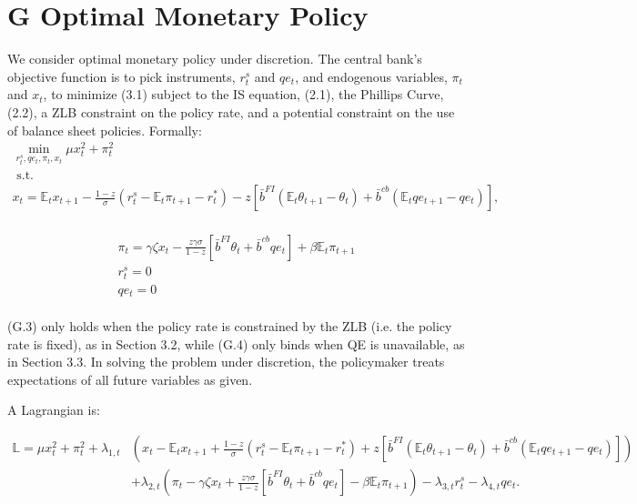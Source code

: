 \documentclass[10pt]{article}
\begin{document}
\section*{G Optimal Monetary Policy}
We consider optimal monetary policy under discretion. The central bank's objective function is to pick instruments, $r_{t}^{s}$ and $q e_{t}$, and endogenous variables, $\pi_{t}$ and $x_{t}$, to minimize (3.1) subject to the IS equation, (2.1), the Phillips Curve, (2.2), a ZLB constraint on the policy rate, and a potential constraint on the use of balance sheet policies. Formally:\\
\begin{gather*}
\min _{r_{t}^{s}, q e_{t}, \pi_{t}, x_{t}} \mu x_{t}^{2}+\pi_{t}^{2} \\
\text { s.t. } \\
x_{t}=\mathbb{E}_{t} x_{t+1}-\frac{1-z}{\sigma}\left(r_{t}^{s}-\mathbb{E}_{t} \pi_{t+1}-r_{t}^{*}\right)-z\left[\bar{b}^{F I}\left(\mathbb{E}_{t} \theta_{t+1}-\theta_{t}\right)+\bar{b}^{c b}\left(\mathbb{E}_{t} q e_{t+1}-q e_{t}\right)\right], \tag{G.1}
\end{gather*}\\
\begin{gather*}
\pi_{t}=\gamma \zeta x_{t}-\frac{z \gamma \sigma}{1-z}\left[\bar{b}^{F I} \theta_{t}+\bar{b}^{c b} q e_{t}\right]+\beta \mathbb{E}_{t} \pi_{t+1}  \tag{G.2}\\
r_{t}^{s}=0  \tag{G.3}\\
q e_{t}=0 \tag{G.4}
\end{gather*}\\
(G.3) only holds when the policy rate is constrained by the ZLB (i.e. the policy rate is fixed), as in Section 3.2, while (G.4) only binds when QE is unavailable, as in Section 3.3. In solving the problem under discretion, the policymaker treats expectations of all future variables as given.

A Lagrangian is:

\begin{equation*}
\begin{aligned}
\mathbb{L}=\mu x_{t}^{2}+\pi_{t}^{2}+\lambda_{1, t} & \left(x_{t}-\mathbb{E}_{t} x_{t+1}+\frac{1-z}{\sigma}\left(r_{t}^{s}-\mathbb{E}_{t} \pi_{t+1}-r_{t}^{*}\right)+z\left[\bar{b}^{F I}\left(\mathbb{E}_{t} \theta_{t+1}-\theta_{t}\right)+\bar{b}^{c b}\left(\mathbb{E}_{t} q e_{t+1}-q e_{t}\right)\right]\right) \\
& +\lambda_{2, t}\left(\pi_{t}-\gamma \zeta x_{t}+\frac{z \gamma \sigma}{1-z}\left[\bar{b}^{F I} \theta_{t}+\bar{b}^{c b} q e_{t}\right]-\beta \mathbb{E}_{t} \pi_{t+1}\right)-\lambda_{3, t} r_{t}^{s}-\lambda_{4, t} q e_{t} .
\end{aligned}
\end{equation*}
\end{document}
